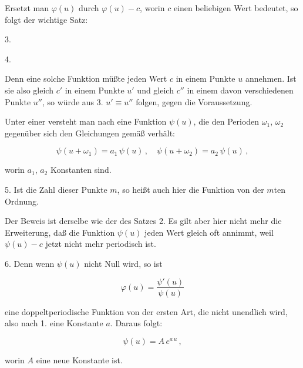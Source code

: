 
Ersetzt man $\varphi(u)$ durch $\varphi(u)-c$, worin $c$ einen beliebigen
Wert bedeutet, so folgt der wichtige Satz:

3. 

4. 

Denn eine solche Funktion müßte jeden Wert $c$ in einem
Punkte $u$ annehmen. Ist sie also gleich $c'$ in einem Punkte $u'$
und gleich $c''$ in einem davon verschiedenen Punkte $u''$, so würde
aus 3. $u'\equiv u''$ folgen, gegen die Voraussetzung.

Unter einer  versteht man nach  eine Funktion $\psi(u)$, die den
Perioden $\omega_1$, $\omega_2$ gegenüber sich den Gleichungen gemäß verhält:

\[ \psi(u+\omega_1) = a_1\,\psi(u)\,, \quad \psi(u+\omega_2) = a_2\,\psi(u)\,, \]

worin $a_1$, $a_2$ Konstanten sind.

5.  Ist die Zahl dieser Punkte $m$, so heißt auch hier die
Funktion von der $m$ten Ordnung.

Der Beweis ist derselbe wie der des Satzes 2. Es gilt aber
hier nicht mehr die Erweiterung, daß die Funktion $\psi(u)$ jeden
Wert gleich oft annimmt, weil $\psi(u)-c$ jetzt nicht mehr periodisch
 ist.

6.  Denn wenn $\psi(u)$
nicht Null wird, so ist

\[ \varphi(u) = \dfrac{\psi'(u)}{\psi(u)} \]

eine doppeltperiodische Funktion von der ersten Art, die nicht
unendlich wird, also nach 1. eine Konstante $a$. Daraus folgt:

\[ \psi(u) = A\,e^{a\,u}\,, \]

worin $A$ eine neue Konstante ist.
